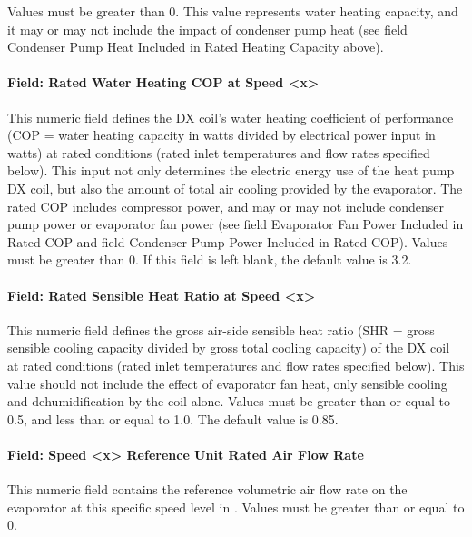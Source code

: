 Values must be greater than 0. This value represents water heating capacity, and it may or may not include the impact of condenser pump heat (see field Condenser Pump Heat Included in Rated Heating Capacity above).


\paragraph{Field: Rated Water Heating COP at Speed \textless{}x\textgreater{}}\label{vshpwhheating-rated-water-heating-cop-at-speed-x}

This numeric field defines the DX coil's water heating coefficient of performance (COP = water heating capacity in watts divided by electrical power input in watts) at rated conditions (rated inlet temperatures and flow rates specified below).
This input not only determines the electric energy use of the heat pump DX coil, but also the amount of total air cooling provided by the evaporator.
The rated COP includes compressor power, and may or may not include condenser pump power or evaporator fan power (see field Evaporator Fan Power Included in Rated COP and field Condenser Pump Power Included in Rated COP). Values must be greater than 0. If this field is left blank, the default value is 3.2.


\paragraph{Field: Rated Sensible Heat Ratio at Speed \textless{}x\textgreater{}}\label{vshpwhheating-rated-sensible-heat-ratio-at-speed-x}

This numeric field defines the gross air-side sensible heat ratio (SHR = gross sensible cooling capacity divided by gross total cooling capacity) of the DX coil at rated conditions (rated inlet temperatures and flow rates specified below). This value should not include the effect of evaporator fan heat, only sensible cooling and dehumidification by the coil alone.
Values must be greater than or equal to 0.5, and less than or equal to 1.0. The default value is 0.85.


\paragraph{Field: Speed \textless{}x\textgreater{} Reference Unit Rated Air Flow Rate}\label{vshpwhheating-speed-x-reference-unit-rated-air-flow-rate}
This numeric field contains the reference volumetric air flow rate on the evaporator at this specific speed level in \si{\volumeFlowRate}. Values must be greater than or equal to 0.


